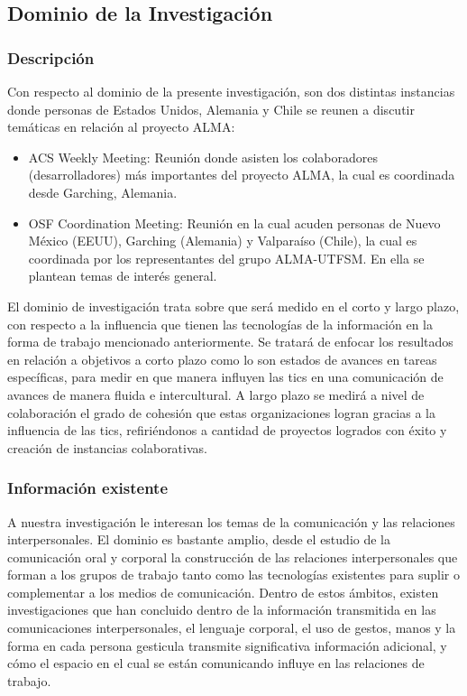 \subsection{Dominio de la Investigación}

\subsubsection{Descripción}
Con respecto al dominio de la presente investigación, son dos distintas
instancias donde personas de Estados Unidos, Alemania y Chile se reunen
a discutir temáticas en relación al proyecto ALMA:

\begin{itemize}
	\item ACS Weekly Meeting: Reunión donde asisten los colaboradores
(desarrolladores) más importantes del proyecto ALMA, la cual es coordinada
 desde Garching, Alemania.
	\item OSF Coordination Meeting: Reunión en la cual acuden personas de Nuevo
México (EEUU), Garching (Alemania) y Valparaíso (Chile), la cual es 
coordinada por los representantes del grupo ALMA-UTFSM. En ella se plantean temas
de interés general.
\end{itemize}

El dominio de investigación trata sobre que será medido en el corto y largo plazo, 
con respecto a la influencia que tienen las tecnologías de la información en la forma
de trabajo mencionado anteriormente. Se tratará de enfocar los resultados en relación
a objetivos a corto plazo como lo son estados de avances en tareas específicas, para 
medir en que manera influyen las tics en una comunicación de avances de manera fluida e 
intercultural. A largo plazo se medirá a nivel de colaboración el grado de cohesión que 
estas organizaciones logran gracias a la influencia de las tics, refiriéndonos a cantidad
de proyectos logrados con éxito y creación de instancias colaborativas.

\subsubsection{Información existente}

A nuestra investigación le interesan los temas de la comunicación y las
relaciones interpersonales. El dominio es bastante amplio, desde el estudio de
la comunicación oral y corporal la construcción de las relaciones
interpersonales que forman a los grupos de trabajo tanto como las tecnologías
existentes para suplir o complementar a los medios de comunicación.
Dentro de estos ámbitos, existen investigaciones\cite{obs_collaborative} que
han concluido dentro de la información transmitida en las comunicaciones
interpersonales, el lenguaje corporal, el uso de gestos, manos y la forma en
cada persona gesticula transmite significativa información adicional, y cómo
el espacio en el cual se están comunicando influye en las relaciones de
trabajo.

